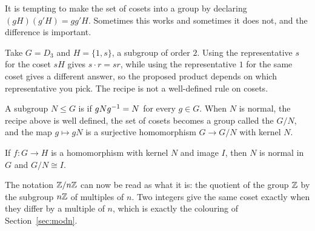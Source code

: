 
It is tempting to make the set of cosets into a group by declaring $(gH)(g'H)=gg'H$. Sometimes this
works and sometimes it does not, and the difference is important.

\begin{pitfall}
Take $G=D_3$ and $H=\{1,s\}$, a subgroup of order $2$. Using the representative $s$ for the coset
$sH$ gives $s\cdot r=sr$, while using the representative $1$ for the same coset gives a different
answer, so the proposed product depends on which representative you pick. The recipe is not a
well-defined rule on cosets.
\end{pitfall}

\begin{defi}
A subgroup $N\le G$ is  if $gNg^{-1}=N$ for every $g\in G$. When $N$ is normal, the
recipe above is well defined, the set of cosets becomes a group called the 
$G/N$, and the map $g\mapsto gN$ is a surjective homomorphism $G\to G/N$ with kernel $N$.
\end{defi}

\begin{thm}
If $f:G\to H$ is a homomorphism with kernel $N$ and image $I$, then $N$ is normal in $G$ and
$G/N\cong I$.
\end{thm}


\noindent The notation $\mathbb{Z}/n\mathbb{Z}$ can now be read as what it is: the quotient of the group $\mathbb{Z}$ by the
subgroup $n\mathbb{Z}$ of multiples of $n$. Two integers give the same coset exactly when they differ by a
multiple of $n$, which is exactly the colouring of Section~\ref{sec:modn}.



